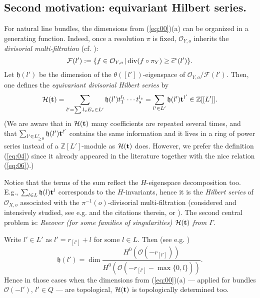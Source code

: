 \documentclass[10pt,a4paper]{amsart}
\numberwithin{equation}{section}
\numberwithin{equation}{subsection}
\theoremstyle{plain}
\theoremstyle{definition}
\begin{document}
\subsection{Second motivation: equivariant Hilbert series.}\label{SM} For
natural line bundles, the dimensions from (\ref{eq:00})(a) can be
organized in a generating function. Indeed, once a resolution
$\pi$ is fixed, ${\mathcal{O}}_{Y,o}$ inherits the {\em divisorial
multi-filtration} (cf. \cite[(4.1.1)]{CDGb}):
\begin{equation}\label{eq:03}
{\mathcal{F}}(l'):=\{ f\in {\mathcal{O}}_{Y,o}\,|\, {\rm div}(f\circ\pi_Y)\geq \widetilde{c}^*(l')\}.
\end{equation}
Let ${\mathfrak{h}}(l') $ be the dimension of the $\theta([l'])$-eigenspace
of ${\mathcal{O}}_{Y,o}/{\mathcal{F}}(l')$. Then, one defines  the {\em equivariant
divisorial Hilbert series} by
\begin{equation}\label{eq:04}
{\mathcal{H}}({{\bf t}})=\sum _{l'=\sum l_vE_v\in L'}
{\mathfrak{h}}(l')t_1^{l_1}\cdots t_s^{l_s}=\sum_{l'\in L'}{\mathfrak{h}}(l'){{\bf t}}^{l'}\in
{\mathbb{Z}}[[L']].
\end{equation}
(We are aware that in ${\mathcal{H}}({{\bf t}})$ many coefficients are repeated
several times, and that $\sum_{l'\in L'_{\geq 0}} {\mathfrak{h}}(l'){{\bf t}}^{l'}$
contains the same information and it lives in a ring of power
series instead of a ${\mathbb{Z}}[L']$-module as ${\mathcal{H}}({{\bf t}})$ does.
However, we prefer the definition (\ref{eq:04}) since it already
appeared in the literature together with the nice relation
(\ref{eq:06}).)

Notice that the terms of the sum reflect the $H$-eigenspace
decomposition too.  E.g., $\sum_{l\in L}{\mathfrak{h}}(l){{\bf t}}^{l}$ corresponds
to the $H$-invariants, hence it is the {\em Hilbert series}  of
${\mathcal{O}}_{X,o}$ associated with the $\pi^{-1}(o)$-divisorial
multi-filtration  (considered and intensively studied, see  e.g.
\cite{CHR} and the citations therein, or \cite{CDG}). The second
central problem is:
 {\em Recover (for some families of
singularities) ${\mathcal{H}}({{\bf t}})$ from $\Gamma$}.

Write $l'\in L'$ as $l'=r_{[l']}+l$ for some $l\in L$. Then (see e.g.
\cite[(4.2.4)]{CDGb})
\begin{equation}\label{eq:05}
{\mathfrak{h}}(l')=\dim
\frac{H^0({\mathcal{O}}(-r_{[l']}))}{H^0({\mathcal{O}}(-r_{[l']}-\max\{0,l\}))}.
\end{equation}
Hence in those cases when the dimensions from (\ref{eq:00})(a)
--- applied for bundles ${\mathcal{O}}(-l')$, $l'\in Q$ --- are topological,
${\mathcal{H}}({{\bf t}})$ is topologically determined too.
\end{document}
